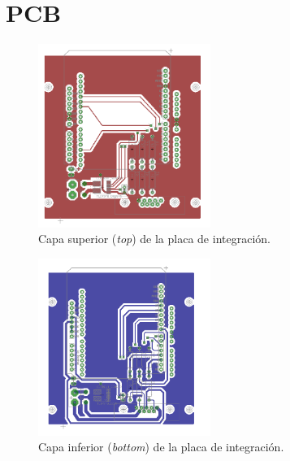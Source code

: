 \section{PCB}\label{anexo_pcb}

\begin{figure}[H]
  \centering
  \includegraphics[width=0.5\textwidth]{img/anexo/top_layer}
  \caption{Capa superior (\textit{top}) de la placa de integración.}
  \label{anexo_pcb_top}
\end{figure}


\begin{figure}[H]
  \centering
  \includegraphics[width=0.5\textwidth]{img/anexo/bottom_layer}
  \caption{Capa inferior (\textit{bottom}) de la placa de integración.}
  \label{anexo_pcb_bottom}
\end{figure}


